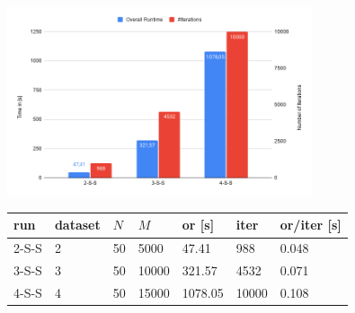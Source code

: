 \documentclass[10pt]{beamer}
\begin{document}
\begin{frame}
    \begin{figure}
        \includegraphics[width=0.8\textwidth]{pics/chart2.png}
    \end{figure}
    \begin{figure}
        \begin{tabular}{l|lll|lll}
            run & dataset & $N$ & $M$ & {\bf or} [s] & {\bf iter} & {\bf or}/{\bf iter} [s] \\
            \hline
            2-S-S  & 2 & 50 &  5000       & 47.41 & 988 & 0.048      \\   
            3-S-S  & 3 & 50 & 10000       & 321.57 & 4532 & 0.071    \\   
            4-S-S  & 4 & 50 & 15000       & 1078.05 & 10000 & 0.108  \\   
        \end{tabular}
    \end{figure}
\end{frame}
\end{document}
